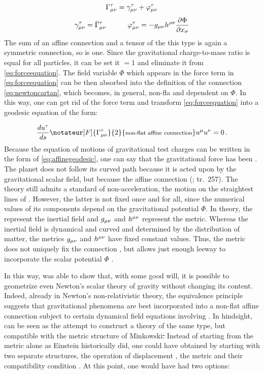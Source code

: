 \documentclass[submitted]{article}
\renewcommand{\Mink}{Minkowski\xspace}
\newcommand{\texts}[1]{\text{\footnotesize{#1}}}
\newcommand{\ctmr}{charge-to-mass ratio\xspace}
\newcommand{\Gtmnbar}{\ensuremath{\bar{\Gamma}\tmn}\xspace}
\renewcommand{\rzlp}[2]{(\cite[#1]{Reichenbach1928}; tr.\ #2)\xspace}
\begin{document}
\begin{equation*}
\Gamma^\tau_{\mu\nu} = \gamma^\tau_{\mu\nu} + \varphi^\tau_{\mu\nu}
\end{equation*}
%
\begin{align}\label{eq:newtoncartan}
\gamma\tmn= \Gtmnbar & \quad \quad & \varphi\tmn =  - g_{\mu \nu} h^{\rho \sigma} \frac{\partial \Phi}{\partial x_\sigma}
\end{align}
%
The sum of an affine connection and a tensor of the this type is again a symmetric connection, so \Gtmn is one. Since the gravitational \ctmr is equal for all particles, it can be set it $=1$ and eliminate it from \cref{eq:forceequation}. The field variable $\Phi$ which appears in the force term in \cref{eq:forceequation} can be then absorbed into the definition of the connection \Gtmn \cref{eq:newtoncartan}, which becomes, in general, non-fla and dependent on $\Phi$. In this way, one can get rid of the force term and transform \cref{eq:forceequation} into a geodesic equation of the form:

\begin{equation}
\label{eq:affinegeodesic} 
\frac{du^\tau}{\dap} \notateur[F]{\Gtmn}{2}{\texts{non-flat affine connection}} u^\mu u^\nu = 0\,.
\end{equation}
%
Because the equation of motions of gravitational test charges can be written in the form of \cref{eq:affinegeodesic}, one can say that the gravitational force has been . The planet does not follow its curved path because it is acted upon by the gravitational scalar field, but because the affine connection \Gtmn {} \rzlp{295}{257}. The theory still admits a standard of non-acceleration, the motion on the straightest lines of \Gtmn. However, the latter is not fixed once and for all, since the numerical values of its components depend on the gravitational potential $\Phi$. In  theory, the \Gtmn represent the inertial field and $g_{\mu\nu}$ and $h^{\mu\nu}$ represent the metric. Whereas the inertial field \Gtmn is dynamical and curved and determined by the distribution of matter, the metrics $g_{\mu\nu}$ and $h^{\mu\nu}$ have fixed constant values. Thus, the metric does not uniquely fix the connection \Gtmn, but allows just enough leeway to incorporate the scalar potential $\Phi$ . 

 In this way, \citet{Friedrichs1928} was able to show that, with some good will, it is possible to geometrize even Newton's scalar theory of gravity without changing its content. Indeed, already in Newton's non-relativistic theory, the equivalence principle suggests that gravitational phenomena are best incorporated into a non-flat affine connection \Gtmn subject to certain dynamical field equations involving \ritea. In hindsight, \gr can be seen as the attempt to construct a theory of the same type, but compatible with the metric structure of \Mink \st. Instead of starting from the metric alone as Einstein historically did, one could have obtained \gr by starting with two separate structures, the operation of displacement \Gtmn, the metric \gmn and their compatibility condition \nonmetr \citep{Stachel2007}. At this point, one would have had two options:
\end{document}
